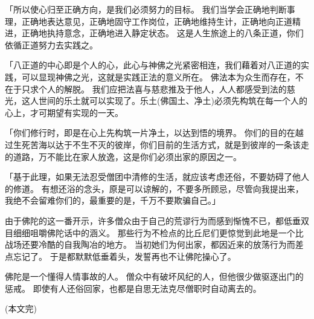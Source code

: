 \documentclass[twoside,openany]{book}
\begin{document}
「所以使心归至正确方向，是我们必须努力的目标。
我们当学会正确地判断事理，正确地表达意见，正确地固守工作岗位，正确地维持生计，正确地向正道精进，正确地执持意念，正确地进入静定状态。
这是人生旅途上的八条正道，你们依循正道努力去实践之。

「八正道的中心即是个人的心，此心与神佛之光紧密相连，我们藉着对八正道的实践，可以显现神佛之光，这就是实践正法的意义所在。
佛法本为众生而存在，不在于只求个人的解脱。
我们应把法喜与慈悲推及于他人，人人都感受到法的慈光，这人世间的乐土就可以实现了。乐土(佛国土、净土)必须先构筑在每一个人的心上，才可期望有实现的一天。

「你们修行时，即是在心上先构筑一片净土，以达到悟的境界。
你们的目的在越过生死苦海以达于不生不灭的彼岸，你们目前的生活方式，就是到彼岸的一条该走的道路，万不能比在家人放逸，这是你们必须出家的原因之一。

「基于此理，如果无法忍受僧团中清修的生活，就应该考虑还俗，不要妨碍了他人的修道。
有想还浴的念头，原是可以谅解的，不要多所顾忌，尽管向我提出来，我绝不会留难你们的，最重要的是，千万不要欺骗自己。」

由于佛陀的这一番开示，许多僧众由于自己的荒谬行为而感到惭愧不已，都低垂双目细细咀嚼佛陀话中的涵义。
那些行为不检点的比丘尼们更惊觉到此地是一个比战场还要冷酷的自我陶冶的地方。
当初她们为何出家，都因近来的放荡行为而差点忘记了。
于是都默默低垂着头，发誓再也不让佛陀操心了。

佛陀是一个懂得人情事故的人。
僧众中有破坏风纪的人，但他很少做驱逐出门的惩戒。
即使有人还俗回家，也都是自思无法克尽僧职时自动离去的。

(本文完)
\end{document}
